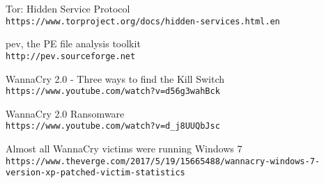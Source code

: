 \documentclass[10pt,a4paper]{article}
\begin{document}
\begin{thebibliography}{1}
Tor: Hidden Service Protocol
\\\texttt{https://www.torproject.org/docs/hidden-services.html.en}

pev, the PE file analysis toolkit
\\\texttt{http://pev.sourceforge.net}

WannaCry 2.0 - Three ways to find the Kill Switch
\\\texttt{https://www.youtube.com/watch?v=d56g3wahBck}

WannaCry 2.0 Ransomware
\\\texttt{https://www.youtube.com/watch?v=d\_j8UUQbJsc}

Almost all WannaCry victims were running Windows 7
\\\texttt{https://www.theverge.com/2017/5/19/15665488/wannacry-windows-7-version-xp-patched-victim-statistics}

\end{thebibliography}
\end{document}
